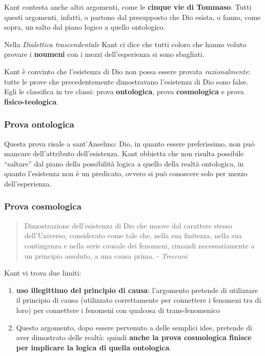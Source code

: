 \documentclass[a4paper, twoside, titlepage]{book}
\newcommand{\citazione}[1]{%
  \begin{quotation}
  #1
  \end{quotation}}
\begin{document}
Kant contesta anche altri argomenti, come le \textbf{cinque vie di Tommaso}. Tutti questi argomenti, infatti, o partono dal presupposto che Dio esista, o fanno, come sopra, un salto dal piano logico a quello ontologico.

Nella \textit{Dialettica trascendentale} Kant ci dice che tutti coloro che hanno voluto provare i \textbf{noumeni} con i mezzi dell’esperienza si sono sbagliati.

Kant è convinto che l’esistenza di Dio non possa essere provata \textit{razionalmente}: tutte le prove che precedentemente dimostravano l’esistenza di Dio sono false. Egli le classifica in tre classi: prova \textbf{ontologica}, prova \textbf{cosmologica} e prova \textbf{fisico-teologica}.

\subsubsection{Prova ontologica}

Questa prova risale a sant’Anselmo: Dio, in quanto essere preferissimo, non può mancare dell’attributo dell’esistenza.
Kant obbietta che non risulta possibile “saltare” dal piano della possibilità logica a quello della realtà ontologica, in quanto l’esistenza non è un predicato, ovvero si può conoscere solo per mezzo dell’esperienza.

\subsubsection{Prova cosmologica}

\citazione{Dimostrazione dell’esistenza di Dio che muove dal carattere stesso dell’Universo, considerato come tale che, nella sua finitezza, nella sua contingenza e nella serie causale dei fenomeni, rimandi necessariamente a un principio assoluto, a una causa prima. - \textit{Treccani}}


Kant vi trova due limiti:
\begin{enumerate}
\item \textbf{uso illegittimo del principio di causa}: l’argomento pretende di utilizzare il principio di causa (utilizzato correttamente per connettere i fenomeni tra di loro) per connettere i fenomeni con qualcosa di trans-fenomenico
\item Questo argomento, dopo essere pervenuto a delle semplici idee, pretende di aver dimostrato delle realtà: quindi \textbf{anche la prova cosmologica finisce per implicare la logica di quella ontologica}.
\end{enumerate}
\end{document}
